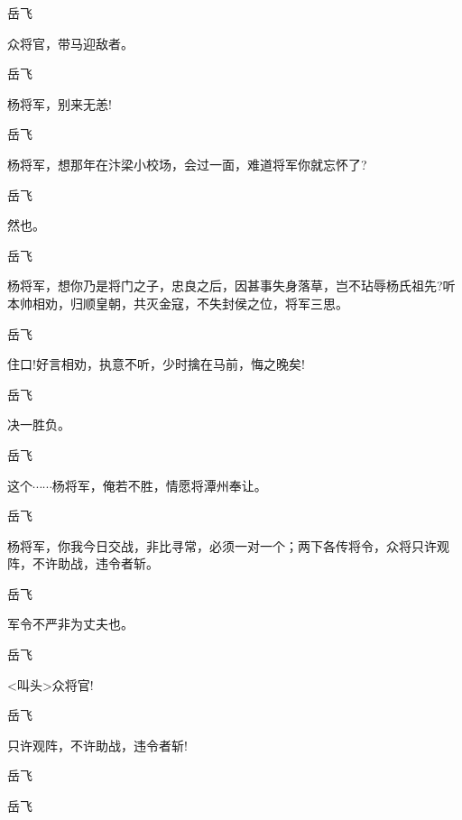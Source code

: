 {{{{岳飞\hspace{30pt}~

众将官，带马迎敌者。}

{岳飞\hspace{30pt}~

杨将军，别来无恙!}

{岳飞\hspace{30pt}~

杨将军，想那年在汴梁小校场，会过一面，难道将军你就忘怀了?}

{岳飞\hspace{30pt}~

然也。}

{岳飞

杨将军，想你乃是将门之子，忠良之后，因甚事失身落草，岂不玷辱杨氏祖先?听本帅相劝，归顺皇朝，共灭金寇，不失封侯之位，将军三思。}

{岳飞\hspace{30pt}~

住口!好言相劝，执意不听，少时擒在马前，悔之晚矣!}

{岳飞\hspace{30pt}~

决一胜负。}

{岳飞\hspace{30pt}~

这个$\cdots{}\cdots{}$杨将军，俺若不胜，情愿将潭州奉让。}

{岳飞

杨将军，你我今日交战，非比寻常，必须一对一个；两下各传将令，众将只许观阵，不许助战，违令者斩。}

{岳飞\hspace{30pt}~

军令不严非为丈夫也。}

{岳飞\hspace{30pt}~

\textless{}叫头\textgreater{}众将官!}

{岳飞\hspace{30pt}~

只许观阵，不许助战，违令者斩!}

{岳飞\hspace{30pt}~

 }

{岳飞

 }

}}}
